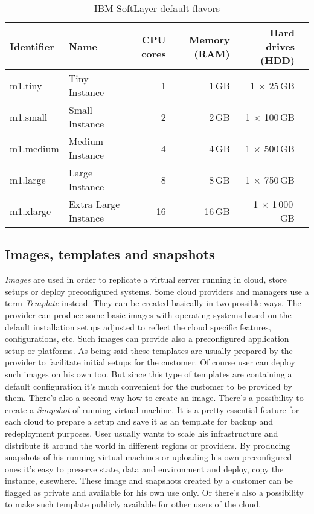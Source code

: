 \begin{table}[ht]
	\centering
	\caption{IBM SoftLayer default flavors}\label{tab:IBM SoftLayer default flavors}
	\begin{tabular}{llrrrr}
		\toprule
		Identifier & Name                 & CPU cores & Memory (RAM) & Hard drives (HDD)     \\
		\midrule
		m1.tiny    & Tiny Instance        & 1         & 1\,GB        & 1 $\times$ 25\,GB     \\
		m1.small   & Small Instance       & 2         & 2\,GB        & 1 $\times$ 100\,GB    \\
		m1.medium  & Medium Instance      & 4         & 4\,GB        & 1 $\times$ 500\,GB    \\
		m1.large   & Large Instance       & 8         & 8\,GB        & 1 $\times$ 750\,GB    \\
		m1.xlarge  & Extra Large Instance & 16        & 16\,GB       & 1 $\times$ 1\,000\,GB \\
		\bottomrule
	\end{tabular}
\end{table}

\subsection{Images, templates and snapshots}
\label{sub:Images, templates and snapshots}

\emph{Images} are used in order to replicate a virtual server running in cloud, store setups or deploy preconfigured systems. Some cloud providers and managers use a term \emph{Template} instead. They can be created basically in two possible ways. The provider can produce some basic images with operating systems based on the default installation setups adjusted to reflect the cloud specific features, configurations, etc. Such images can provide also a preconfigured application setup or platforms. As being said these templates are usually prepared by the provider to facilitate initial setups for the customer. Of course user can deploy such images on his own too. But since this type of templates are containing a default configuration it's much convenient for the customer to be provided by them. There's also a second way how to create an image. There's a possibility to create a \emph{Snapshot} of running virtual machine. It is a pretty essential feature for each cloud to prepare a setup and save it as an template for backup and redeployment purposes. User usually wants to scale his infrastructure and distribute it around the world in different regions or providers. By producing snapshots of his running virtual machines or uploading his own preconfigured ones it's easy to preserve state, data and environment and deploy, copy the instance, elsewhere. These image and snapshots created by a customer can be flagged as private and available for his own use only. Or there's also a possibility to make such template publicly available for other users of the cloud.

